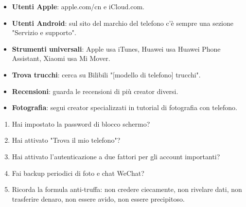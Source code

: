 

\begin{itemize}
  \item \textbf{Utenti Apple}: apple.com/cn e iCloud.com.
  \item \textbf{Utenti Android}: sul sito del marchio del telefono c'è sempre una sezione "Servizio e supporto".
  \item \textbf{Strumenti universali}: Apple usa iTunes, Huawei usa Huawei Phone Assistant, Xiaomi usa Mi Mover.
\end{itemize}


\begin{itemize}
  \item \textbf{Trova trucchi}: cerca su Bilibili "[modello di telefono] trucchi".
  \item \textbf{Recensioni}: guarda le recensioni di più creator diversi.
  \item \textbf{Fotografia}: segui creator specializzati in tutorial di fotografia con telefono.
\end{itemize}


\begin{enumerate}
  \item Hai impostato la password di blocco schermo?
  \item Hai attivato "Trova il mio telefono"?
  \item Hai attivato l'autenticazione a due fattori per gli account importanti?
  \item Fai backup periodici di foto e chat WeChat?
  \item Ricorda la formula anti-truffa: non credere ciecamente, non rivelare dati, non trasferire denaro, non essere avido, non essere precipitoso.
\end{enumerate}
